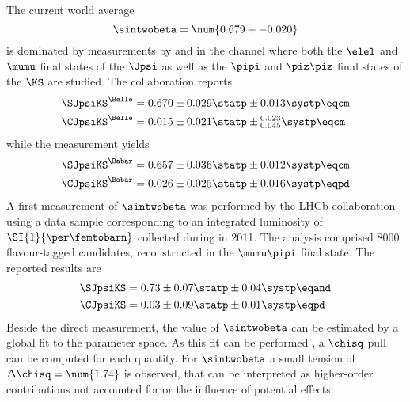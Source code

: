 The current world average \cite{Amhis:2014hma}
%
\begin{equation*}
  \sintwobeta = \num{0.679 +- 0.020}
\end{equation*}
%
is  dominated by measurements by \Babar and \Belle in the
\BdToJpsiKS channel where both the $\elel$ and $\mumu$ final states of the
$\Jpsi$ as well as the $\pipi$ and $\piz\piz$ final states of the $\KS$ are
studied. The \Belle collaboration \cite{Adachi:2012et} reports
%
\begin{equation*}
  \begin{split}
    \SJpsiKS^{\text{\Belle}} &= 0.670 \pm 0.029 \statp \pm 0.013 \systp \eqcm \\
    \CJpsiKS^{\text{\Belle}} &= 0.015 \pm 0.021 \statp \pm {}_{0.045}^{0.023} \systp \eqcm
  \end{split}
\end{equation*}
%
while the \Babar measurement \cite{Aubert:2009aw} yields
%
\begin{equation*}
  \begin{split}
    \SJpsiKS^{\text{\Babar}} &= 0.657 \pm 0.036 \statp \pm 0.012 \systp \eqcm \\
    \CJpsiKS^{\text{\Babar}} &= 0.026 \pm 0.025 \statp \pm 0.016 \systp \eqpd
  \end{split}
\end{equation*}
%
A first measurement of $\sintwobeta$ was performed by the \acs*{LHCb}
collaboration using a data sample corresponding to an integrated luminosity of
$\SI{1}{\per\femtobarn}$ collected during \RunOne in 2011. The analysis
comprised $\num{8000}$ flavour-tagged \BdToJpsiKS candidates, reconstructed in
the $\mumu\pipi$ final state. The reported results \cite{Aaij:1497268} are
%
\begin{equation*}
  \begin{split}
    \SJpsiKS &= 0.73 \pm 0.07 \statp \pm 0.04 \systp \eqand \\
    \CJpsiKS &= 0.03 \pm 0.09 \statp \pm 0.01 \systp \eqpd
  \end{split}
\end{equation*}
%
Beside the direct measurement, the value of $\sintwobeta$ can be estimated by a
global fit to the \CKM parameter space. As this fit can be performed , a $\chisq$ pull can be computed for
each quantity. For $\sintwobeta$ a small tension of $\Delta\chisq = \num{1.74}$
is observed, that can be interpreted as higher-order contributions not accounted
for or the influence of potential \BSM effects.
